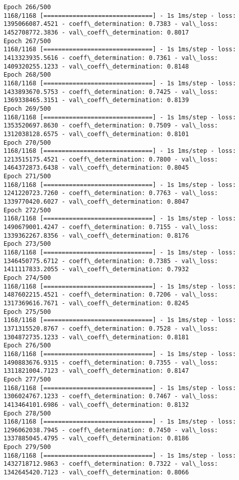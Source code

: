 \documentclass[11pt]{article}
\begin{document}
\begin{Verbatim}[commandchars=\\\{\}]
Epoch 266/500
1168/1168 [==============================] - 1s 1ms/step - loss: 1395066087.4521 - coeff\_determination: 0.7383 - val\_loss: 1452708772.3836 - val\_coeff\_determination: 0.8017
Epoch 267/500
1168/1168 [==============================] - 1s 1ms/step - loss: 1413323935.5616 - coeff\_determination: 0.7361 - val\_loss: 1409320255.1233 - val\_coeff\_determination: 0.8148
Epoch 268/500
1168/1168 [==============================] - 1s 1ms/step - loss: 1433893670.5753 - coeff\_determination: 0.7425 - val\_loss: 1369338465.3151 - val\_coeff\_determination: 0.8139
Epoch 269/500
1168/1168 [==============================] - 1s 1ms/step - loss: 1353520697.8630 - coeff\_determination: 0.7509 - val\_loss: 1312038128.6575 - val\_coeff\_determination: 0.8101
Epoch 270/500
1168/1168 [==============================] - 1s 1ms/step - loss: 1213515175.4521 - coeff\_determination: 0.7800 - val\_loss: 1464372873.6438 - val\_coeff\_determination: 0.8045
Epoch 271/500
1168/1168 [==============================] - 1s 1ms/step - loss: 1241220723.7260 - coeff\_determination: 0.7763 - val\_loss: 1339770420.6027 - val\_coeff\_determination: 0.8047
Epoch 272/500
1168/1168 [==============================] - 1s 1ms/step - loss: 1490679001.4247 - coeff\_determination: 0.7155 - val\_loss: 1339362267.8356 - val\_coeff\_determination: 0.8176
Epoch 273/500
1168/1168 [==============================] - 1s 1ms/step - loss: 1346450775.6712 - coeff\_determination: 0.7385 - val\_loss: 1411117833.2055 - val\_coeff\_determination: 0.7932
Epoch 274/500
1168/1168 [==============================] - 1s 1ms/step - loss: 1487602215.4521 - coeff\_determination: 0.7206 - val\_loss: 1317369616.7671 - val\_coeff\_determination: 0.8245
Epoch 275/500
1168/1168 [==============================] - 1s 1ms/step - loss: 1371315520.8767 - coeff\_determination: 0.7528 - val\_loss: 1304872735.1233 - val\_coeff\_determination: 0.8181
Epoch 276/500
1168/1168 [==============================] - 1s 1ms/step - loss: 1490883676.9315 - coeff\_determination: 0.7355 - val\_loss: 1311821004.7123 - val\_coeff\_determination: 0.8147
Epoch 277/500
1168/1168 [==============================] - 1s 1ms/step - loss: 1306024767.1233 - coeff\_determination: 0.7467 - val\_loss: 1413464101.6986 - val\_coeff\_determination: 0.8132
Epoch 278/500
1168/1168 [==============================] - 1s 1ms/step - loss: 1296062038.7945 - coeff\_determination: 0.7450 - val\_loss: 1337885045.4795 - val\_coeff\_determination: 0.8186
Epoch 279/500
1168/1168 [==============================] - 1s 1ms/step - loss: 1432718712.9863 - coeff\_determination: 0.7322 - val\_loss: 1342645420.7123 - val\_coeff\_determination: 0.8066

\end{Verbatim}
\end{document}

